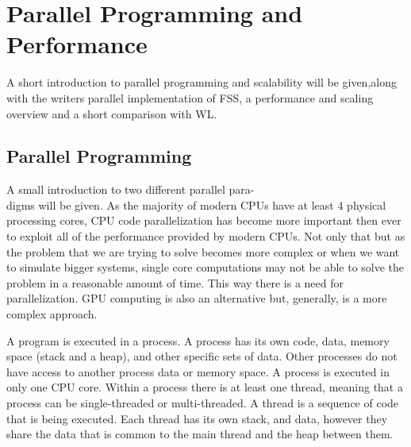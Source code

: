 \chapter{Parallel Programming and Performance}

	A short introduction to parallel programming and scalability will be given,along with the writers parallel implementation of FSS, a performance and scaling overview and a short comparison with WL.

\section{Parallel Programming}

		A small introduction to two different parallel para-\\digms will be given. As the majority of modern CPUs have at least 4 physical processing cores, CPU code parallelization has become more important then ever to exploit all of the performance provided by modern CPUs. Not only that but as the problem that we are trying to solve becomes more complex or when we want to simulate bigger systems, single core computations may not be able to solve the problem in a reasonable amount of time. This way there is a need for parallelization. GPU computing is also an alternative but, generally, is a more complex approach.

	A program is executed in a process. A process has its own code, data, memory space (stack and a heap), and other specific sets of data. Other processes do not have access to another process data or memory space. A process is executed in only one CPU core. Within a process there is at least one thread, meaning that a process can be single-threaded or multi-threaded. A thread is a sequence of code that is being executed. Each thread has its own stack, and data, however they share the data that is common to the main thread and the heap between them.


